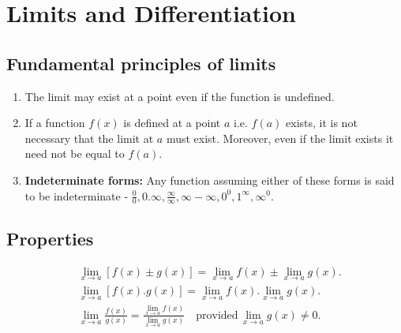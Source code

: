 \section{Limits and Differentiation}
\subsection{Fundamental principles of limits}
\begin{enumerate}
\item The limit may exist at a point even if the function is undefined.
\item If a function $f(x)$ is defined at a point $a$ i.e. $f(a)$ exists, it is not necessary that the limit at $a$ must exist. Moreover, even if the limit exists it need not be equal to $f(a)$.
\item \textbf{Indeterminate forms:} Any function assuming either of these forms is said to be indeterminate - $\frac{0}{0}, 0.\infty,\frac{\infty}{\infty},\infty - \infty, 0^0, 1^\infty, \infty^0$.
\end{enumerate}

\vspace{-5mm}

\subsection{Properties}
\vspace{-1mm}
\begin{align*}
&\lim_{x \to a} [f(x) \pm g(x)] = \lim_{x \to a} f(x) \pm \lim_{x \to a} g(x).\\
&\lim_{x \to a} [f(x).g(x)] = \lim_{x \to a} f(x).\lim_{x \to a} g(x).\\
&\lim_{x \to a} \frac{f(x)}{g(x)} = \frac{\lim_{x \to a} f(x)}{\lim_{x \to a} g(x)} \quad \text{provided} \, \lim_{x \to a} g(x) \neq 0.
\end{align*}

\vspace{-5mm}

